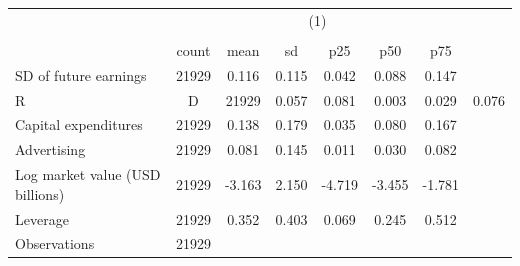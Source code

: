 {
\def\sym#1{\ifmmode^{#1}\else\(^{#1}\)\fi}
\begin{tabular}{l*{1}{cccccc}}
\hline\hline
                    &                                                      \\
                    &                                                         \\
                    &       count&        mean&          sd&         p25&         p50&         p75\\
\hline
SD of future earnings&       21929&       0.116&       0.115&       0.042&       0.088&       0.147\\
R&D                 &       21929&       0.057&       0.081&       0.003&       0.029&       0.076\\
Capital expenditures&       21929&       0.138&       0.179&       0.035&       0.080&       0.167\\
Advertising         &       21929&       0.081&       0.145&       0.011&       0.030&       0.082\\
Log market value (USD billions)&       21929&      -3.163&       2.150&      -4.719&      -3.455&      -1.781\\
Leverage            &       21929&       0.352&       0.403&       0.069&       0.245&       0.512\\
\hline
Observations        &       21929&            &            &            &            &            \\
\hline\hline
\end{tabular}
}

